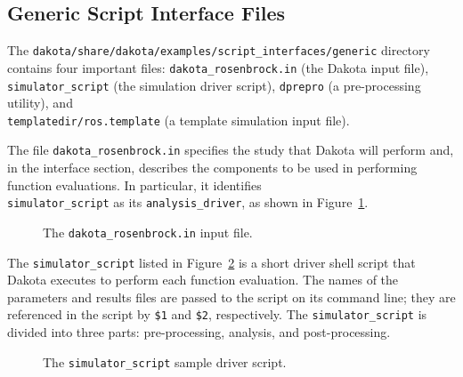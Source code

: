 \subsection{Generic Script Interface Files}\label{interfaces:generic}

The {\tt dakota/share/dakota/examples/script\_interfaces/generic} directory contains four important files:
\texttt{dakota\_rosenbrock.in} (the Dakota input file),
\texttt{simulator\_script} (the simulation driver script),
\texttt{dprepro} (a pre-processing utility), and \\
\texttt{templatedir/ros.template} (a template simulation input file).

The file \texttt{dakota\_rosenbrock.in} specifies the study that
Dakota will perform and, in the interface section, describes the
components to be used in performing function evaluations. In
particular, it identifies \\ \texttt{simulator\_script} as its
\texttt{analysis\_driver}, as shown in Figure~\ref{advint:figure01}.
\begin{figure}
  \centering
  \begin{bigbox}
    \begin{small}
    \end{small}
  \end{bigbox}
  \caption{The \texttt{dakota\_rosenbrock.in} input file.}
  \label{advint:figure01}
\end{figure}

The \texttt{simulator\_script} listed in Figure~\ref{advint:figure02}
is a short driver shell script that Dakota executes to perform each
function evaluation. The names of the parameters and results files are
passed to the script on its command line; they are
referenced in the script by \texttt{\$1}
and \texttt{\$2}, respectively. The \texttt{simulator\_script}
is divided into three parts: pre-processing, analysis, and post-processing.

\begin{figure}
  \centering
  \begin{bigbox}
    \begin{small}
    \end{small}
  \end{bigbox}
  \caption{The \texttt{simulator\_script} sample driver script.}
  \label{advint:figure02}
\end{figure}

